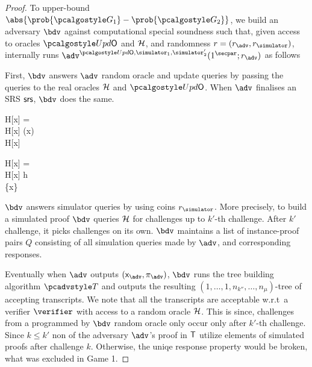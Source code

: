 \begin{proof}
 	To upper-bound $\abs{\prob{\game{1}} - \prob{\game{2}}}$, we build an adversary $\bdv$ against computational special soundness such that, given access to oracles $\initU$ and $\mathcal{H}$, and randomness $r = (r_\adv, \rsim)$, internally runs $\advse^{\initU, \simulator_1, \simulator_2'} (1^\secpar; r_\adv)$ as follows%
		\item
		First, $\bdv$ answers $\adv$ random oracle and update queries by passing the queries to the real
		oracles $\mathcal{H}$ and $\initU$. When $\adv$ finalises an SRS $\mathsf{srs}$, $\bdv$ does the same.

		\begin{pcvstack}
			\begin{pchstack}
				{
				\pcif H[x] = \bot \pcthen \\
				\quad H[x] \gets \ro(x) \\
				\pcreturn H[x]
		  		}
				
				\pchspace
				
				{ 
					\pcif H[x] = \bot \pcthen \\ 
					\quad H[x] \gets h \\
					\quad \mathsf{Prog} \gets {} \cup \{x\}
				}
			\end{pchstack}
		\end{pcvstack}
		
		$\bdv$ answers simulator queries by using coins $\rsim$. More precisely, to build a simulated proof $\bdv$ queries $\mathcal{H}$ for challenges up to $k'$-th challenge. After $k'$ challenge, it picks challenges on its own. $\bdv$ maintains a
		list of instance-proof pairs $Q$ consisting of all simulation queries made by
		$\adv$, and corresponding responses.
		
		Eventually when $\adv$ outputs $(\inp_\advse, \zkproof_\advse)$, $\bdv$ runs the tree building algorithm $\tdv$ and outputs the resulting $(1, \ldots, 1, n_{k''}, \ldots, n_\mu)$-tree of accepting transcripts. We note that all the transcripts are acceptable w.r.t~a verifier $\verifier$ with access to a random oracle $\mathcal{H}$. This is since, challenges from a programmed by $\bdv$ random oracle only occur only after $k'$-th challenge. Since $k \leq k'$ non of the adversary $\adv$'s proof in $\mathsf{T}$ utilize elements of simulated proofs after challenge $k$. Otherwise, the uniqe response property would be broken, what was excluded in Game 1.
	

\end{proof}
